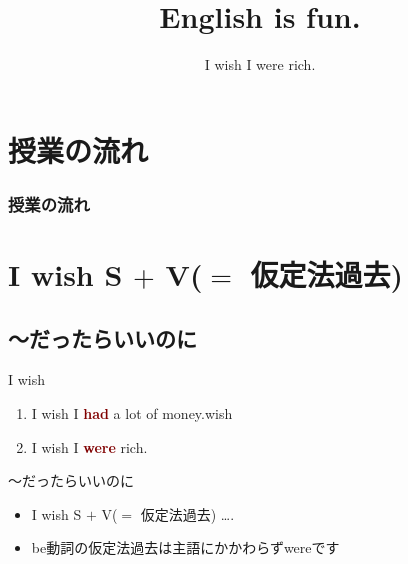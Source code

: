 \documentclass[aspectratio=169,xcolor={dvipsnames,table}]{beamer}
\title{English is fun.}
\subtitle{I wish I were rich.}
\author{}
\institute[]{}
\date[]
\begin{document}
\begin{frame}[plain]
  \titlepage
\end{frame}

\section*{授業の流れ}
\begin{frame}[plain]
  \frametitle{授業の流れ}
  \tableofcontents
\end{frame}

\section{I wish S $+$ V($=$ 仮定法過去)}
\subsection{～だったらいいのに}
\begin{frame}[plain]{I wish}
\large
 \begin{enumerate}
  \item I wish I \textcolor{Maroon}{\bfseries had} a lot of money.\hfill{}wish 
  \item I wish I \textcolor{Maroon}{\bfseries were} rich.
\end{enumerate}

\vfill

\begin{block}{～だったらいいのに}
\small
\begin{itemize}[square]
 \item I wish S $+$ V($=$ {\scriptsize 仮定法過去}) \ldots .
 \item be動詞の仮定法過去は主語にかかわらずwereです
\end{itemize}
\end{block}
\mbox{}\hfill{} 
\end{frame}
\end{document}
